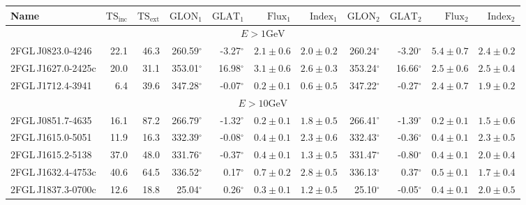 \documentclass[12pt,preprint]{aastex}
\newcommand{\gev}{\text{GeV}\xspace}
\newcommand{\tsext}{{\ensuremath{\text{TS}_{\text{ext}}}}\xspace}
\newcommand{\tsinc}{\ensuremath{\text{TS}_{\text{inc}}}\xspace}
\newcommand{\glon}{\text{GLON}\xspace}
\newcommand{\glat}{\text{GLAT}\xspace}
\renewcommand{\deg}{\ensuremath{^\circ}\xspace}
\begin{document}
\clearpage
\begin{table}
    \begin{centering}
      \begin{tabular}{l|rr|rrrr|rrrr}
        \hline
        \hline
        Name                 &     \tsinc &     \tsext &      $\glon_1$ &      $\glat_1$ &   $\text{Flux}_1$ &   $\text{Index}_1$ &      $\glon_2$ &      $\glat_2$ &   $\text{Flux}_2$ &  $\text{Index}_2$ \\
        \hline
        \multicolumn{11}{c}{$E > 1 \gev$} \\
        \hline
        2FGL\,J0823.0-4246   &       22.1 &       46.3 &     260.59\deg &      -3.27\deg & $       2.1 \pm        0.6$ & $  2.0 \pm   0.2$  &     260.24\deg &      -3.20\deg & $       5.4 \pm        0.7$ & $  2.4 \pm   0.2$ \\
        2FGL\,J1627.0-2425c  &       20.0 &       31.1 &     353.01\deg &      16.98\deg & $       3.1 \pm        0.6$ & $  2.6 \pm   0.3$  &     353.24\deg &      16.66\deg & $       2.5 \pm        0.6$ & $  2.5 \pm   0.4$ \\
        2FGL\,J1712.4-3941   &        6.4 &       39.6 &     347.28\deg &      -0.07\deg & $       0.2 \pm        0.1$ & $  0.6 \pm   0.5$  &     347.22\deg &      -0.27\deg & $       2.4 \pm        0.7$ & $  1.9 \pm   0.2$ \\
        \hline
        \multicolumn{11}{c}{$E > 10 \gev$} \\
        \hline
        2FGL\,J0851.7-4635   &       16.1 &       87.2 &     266.79\deg &      -1.32\deg & $       0.2 \pm        0.1$ & $  1.8 \pm   0.5$  &     266.41\deg &      -1.39\deg & $       0.2 \pm        0.1$ & $  1.5 \pm   0.6$ \\
        2FGL\,J1615.0-5051   &       11.9 &       16.3 &     332.39\deg &      -0.08\deg & $       0.4 \pm        0.1$ & $  2.3 \pm   0.6$  &     332.43\deg &      -0.36\deg & $       0.4 \pm        0.1$ & $  2.3 \pm   0.5$ \\
        2FGL\,J1615.2-5138   &       37.0 &       48.0 &     331.76\deg &      -0.37\deg & $       0.4 \pm        0.1$ & $  1.3 \pm   0.5$  &     331.47\deg &      -0.80\deg & $       0.4 \pm        0.1$ & $  2.0 \pm   0.4$ \\
        2FGL\,J1632.4-4753c  &       40.6 &       64.5 &     336.52\deg &       0.17\deg & $       0.7 \pm        0.2$ & $  2.8 \pm   0.5$  &     336.13\deg &       0.37\deg & $       0.5 \pm        0.1$ & $  1.7 \pm   0.4$ \\
        2FGL\,J1837.3-0700c  &       12.6 &       18.8 &      25.04\deg &       0.26\deg & $       0.3 \pm        0.1$ & $  1.2 \pm   0.5$  &      25.10\deg &      -0.05\deg & $       0.4 \pm        0.1$ & $  2.0 \pm   0.5$ \\

\end{tabular}
\end{centering}
\end{table}
\end{document}
